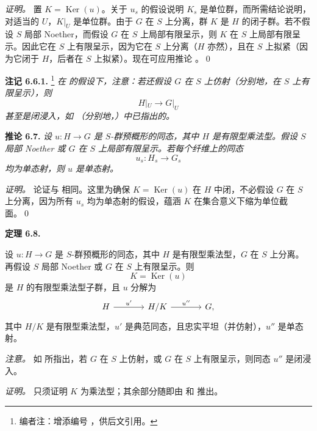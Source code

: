 \emph{证明。}
置 \(K=\operatorname{Ker}(u)\)。关于 \(u_s\) 的假设说明 \(K_s\) 是单位群，而所需结论说明，对适当的 \(U\)，\(K|_U\) 是单位群。由于 \(G\) 在 \(S\) 上分离，群 \(K\) 是 \(H\) 的闭子群。若不假设 \(S\) 局部 Noether，而假设 \(G\) 在 \(S\) 上局部有限呈示，则 \(K\) 在 \(S\) 上局部有限呈示。\footnotemark[43] 因此它在 \(S\) 上有限呈示，因为它在 \(S\) 上分离（\(H\) 亦然），且在 \(S\) 上拟紧（因为它闭于 \(H\)，后者在 \(S\) 上拟紧）。现在可应用推论 。\qed

\medskip
\noindent{}\textbf{注记 6.6.1.}%
\footnote{编者注：增添编号 ，供后文引用。}
\textit{在  的假设下，注意：若还假设 \(G\) 在 \(S\) 上仿射（分别地，在 \(S\) 上有限呈示），则
\[
  H|_U\longrightarrow G|_U
\]
甚至是闭浸入，如 （分别地，）中已指出的。}

\medskip
\noindent{}\textbf{推论 6.7.}
\textit{设 \(u:H\to G\) 是 \(S\)-群预概形的同态，其中 \(H\) 是有限型乘法型。假设 \(S\) 局部 Noether 或 \(G\) 在 \(S\) 上局部有限呈示。若每个纤维上的同态
\[
  u_s:H_s\longrightarrow G_s
\]
均为单态射，则 \(u\) 是单态射。}

\emph{证明。}
论证与  相同。这里为确保 \(K=\operatorname{Ker}(u)\) 在 \(H\) 中闭，不必假设 \(G\) 在 \(S\) 上分离，因为所有 \(u_s\) 均为单态射的假设，蕴涵 \(K\) 在集合意义下缩为单位截面。\qed

\medskip
\noindent{}\textbf{定理 6.8.}
\begin{itshape}
设 \(u:H\to G\) 是 \(S\)-群预概形的同态，其中 \(H\) 是有限型乘法型，\(G\) 在 \(S\) 上分离。再假设 \(S\) 局部 Noether 或 \(G\) 在 \(S\) 上有限呈示。则
\[
  K=\operatorname{Ker}(u)
\]
是 \(H\) 的有限型乘法型子群，且 \(u\) 分解为
\[
\begin{tikzcd}[column sep=large]
  H
    \arrow[r,"u'"]
  & H/K
    \arrow[r,"u''"]
  & G,
\end{tikzcd}
\]
其中 \(H/K\) 是有限型乘法型，\(u'\) 是典范同态，且忠实平坦（并仿射），\(u''\) 是单态射。
\end{itshape}

\emph{注意。}
如  所指出，若 \(G\) 在 \(S\) 上仿射，或 \(G\) 在 \(S\) 上有限呈示，则同态 \(u''\) 是闭浸入。

\emph{证明。}
只须证明 \(K\) 为乘法型；其余部分随即由  和  推出。

